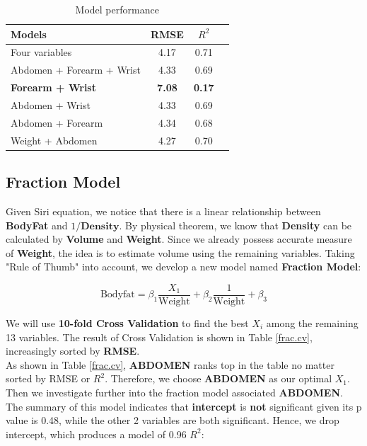 \documentclass[11pt, twocolumn]{article}
\begin{document}
 \begin{table}[]
    \centering
    \begin{tabular}{l|ccc}
        \hline
         Models & RMSE & $R^2$ \\
         \hline
         Four variables & 4.17 & 0.71 \\
         Abdomen + Forearm + Wrist & 4.33 & 0.69 \\
         \textbf{Forearm + Wrist} & \textbf{7.08} & \textbf{0.17} \\
         Abdomen + Wrist & 4.33 & 0.69 \\
         Abdomen + Forearm & 4.34 & 0.68 \\
         Weight + Abdomen & 4.27 & 0.70 \\
         \hline
    \end{tabular}
    \caption{Model performance}
    \label{linear.performance}
\end{table}



\subsection{Fraction Model}
Given Siri equation, we notice that there is a linear relationship between \textbf{BodyFat} and $1 / \textbf{Density}$. By physical theorem, we know that \textbf{Density} can be calculated by \textbf{Volume} and \textbf{Weight}. Since we already possess accurate measure of \textbf{Weight}, the idea is to estimate volume using the remaining variables. Taking "Rule of Thumb" into account, we develop a new model named \textbf{Fraction Model}: 

$$\text{Bodyfat} = \beta_1 \frac{X_1}{ \text{Weight} }
				 + \beta_2 \frac{1}{ \text{Weight} } + \beta_3$$

We will use \textbf{10-fold Cross Validation} to find the best $X_i$ among the remaining 13 variables. The result of Cross Validation is shown in Table \ref{frac.cv}, increasingly sorted by \textbf{RMSE}. \\

As shown in Table \ref{frac.cv}, \textbf{ABDOMEN} ranks top in the table no matter sorted by RMSE or $R^2$. Therefore, we choose \textbf{ABDOMEN} as our optimal $X_1$. \\

Then we investigate further into the fraction model associated \textbf{ABDOMEN}. The summary of this model indicates that \textbf{intercept} is \textbf{not} significant given its p value is 0.48, while the other 2 variables are both significant. Hence, we drop intercept, which produces a model of 0.96 $R^2$:
\end{document}

